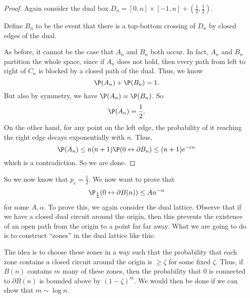\documentclass[a4paper]{article}
\begin{document}
\begin{proof}
  Again consider the dual box $D_n = [0, n] \times [-1, n] + \left(\frac{1}{2}, \frac{1}{2}\right)$.
  \begin{center}
  \end{center}
  Define $B_n$ to be the event that there is a top-bottom crossing of $D_n$ by closed edges of the dual.

  As before, it cannot be the case that $A_n$ and $B_n$ both occur. In fact, $A_n$ and $B_n$ partition the whole space, since if $A_n$ does not hold, then every path from left to right of $C_n$ is blocked by a closed path of the dual. Thus, we know
  \[
    \P(A_n) + \P(B_n) = 1.
  \]
  But also by symmetry, we have $\P(A_n) = \P(B_n)$. So
  \[
    \P (A_n) = \frac{1}{2}.
  \]
  On the other hand, for any point on the left edge, the probability of it reaching the right edge decays exponentially with $n$. Thus,
  \[
    \P(A_n) \leq n (n + 1) \P(0 \leftrightarrow \partial B_n) \leq (n + 1) e^{-cn}
  \]
  which is a contradiction. So we are done.
\end{proof}

So we now know that $p_c = \frac{1}{2}$. We now want to prove that
\[
  \P_{\frac{1}{2}}(0 \leftrightarrow \partial B(n)) \leq A n^{-\alpha}
\]
for some $A, \alpha$. To prove this, we again consider the dual lattice. Observe that if we have a closed dual circuit around the origin, then this prevents the existence of an open path from the origin to a point far far away. What we are going to do is to construct ``zones'' in the dual lattice like this:
\begin{center}
\end{center}
The idea is to choose these zones in a way such that the probability that each zone contains a closed circuit around the origin is $\geq \zeta$ for some fixed $\zeta$. Thus, if $B(n)$ contains $m$ many of these zones, then the probability that $0$ is connected to $\partial B(n)$ is bounded above by $(1 - \zeta)^m$. We would then be done if we can show that $m \sim \log n$.
\end{document}
